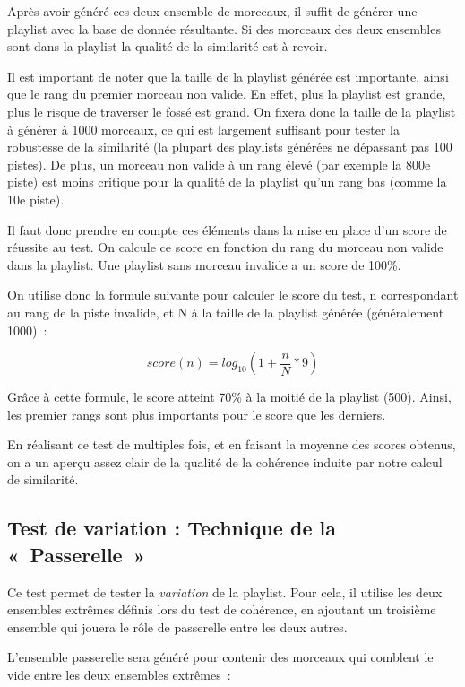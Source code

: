 Après avoir généré ces deux ensemble de morceaux, il suffit de générer une
playlist avec la base de donnée résultante. Si des morceaux des deux ensembles
sont dans la playlist la qualité de la similarité est à revoir.

Il est important de noter que la taille de la playlist générée est importante,
ainsi que le rang du premier morceau non valide. En effet, plus la playlist est
grande, plus le risque de traverser le fossé est grand. On fixera donc la taille
de la playlist à générer à 1000 morceaux, ce qui est largement suffisant pour
tester la robustesse de la similarité (la plupart des playlists générées ne
dépassant pas 100 pistes). De plus, un morceau non valide à un rang élevé (par
exemple la 800e piste) est moins critique pour la qualité de la playlist qu'un
rang bas (comme la 10e piste).

Il faut donc prendre en compte ces éléments dans la mise en place d'un score de
réussite au test. On calcule ce score en fonction du rang du morceau non
valide dans la playlist. Une playlist sans morceau invalide a un score de
100\%.

On utilise donc la formule suivante pour calculer le score du test, n
correspondant au rang de la piste invalide, et N à la taille de la playlist
générée (généralement 1000)~:

\begin{equation*}
  score(n) = log_{10}(1 + \frac{n}{N} * 9)
\end{equation*}

Grâce à cette formule, le score atteint 70\% à la moitié de la playlist (500).
Ainsi, les premier rangs sont plus importants pour le score que les derniers.

En réalisant ce test de multiples fois, et en faisant la moyenne des scores
obtenus, on a un aperçu assez clair de la qualité de la cohérence induite
par notre calcul de similarité.

\subsection{Test de variation : Technique de la «~Passerelle~»}
\label{tests:qualite:variation-passerelle}

Ce test permet de tester la \emph{variation} de la playlist. Pour cela, il
utilise les deux ensembles extrêmes définis lors du test de cohérence, en 
ajoutant un troisième ensemble qui jouera le rôle de passerelle entre les
deux autres.

L'ensemble passerelle sera généré pour contenir des morceaux qui comblent le
vide entre les deux ensembles extrêmes~:

